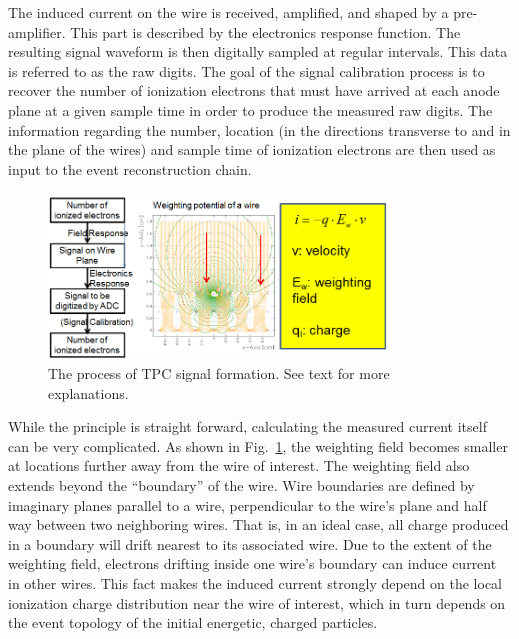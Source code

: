 The induced current on the wire is received, amplified, and shaped by
a pre-amplifier. This part is described by the electronics response
function.  The resulting signal waveform is then digitally sampled at
regular intervals.  This data is referred to as the raw digits.  The
goal of the signal calibration process is to recover the number of
ionization electrons that must have arrived at each anode plane at a
given sample time in order to produce the measured raw digits.  The
information regarding the number, location (in the directions transverse
to and in the plane of the wires) and sample time of ionization
electrons are then used as input to the event reconstruction chain.

\begin{figure}[htb]
\centering
\includegraphics[width=0.8\textwidth]{figures/Signal_formation.png}
\caption{The process of TPC signal formation. See text for more explanations.}
\label{fig:signal_formation}
\end{figure}

While the principle is straight forward, calculating the measured
current itself can be very complicated. As shown in
Fig.~\ref{fig:signal_formation}, the weighting field becomes smaller
at locations further away from the wire of interest.  
The weighting field also extends beyond the ``boundary'' of the wire.
Wire boundaries are defined by imaginary planes parallel to a wire,
perpendicular to the wire's plane and half way between two neighboring
wires.  That is, in an ideal case, all charge produced in a boundary
will drift nearest to its associated wire.
Due to the extent of the weighting field, electrons drifting inside
one wire's boundary can induce current in other wires.  This fact
makes the induced current strongly depend on the local ionization
charge distribution near the wire of interest, which in turn depends
on the event topology of the initial energetic, charged particles.


